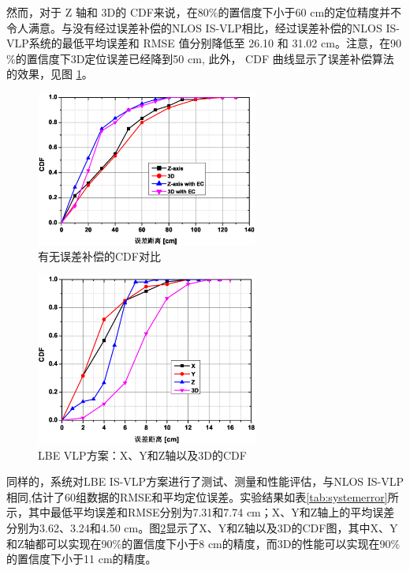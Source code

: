 然而，对于 Z 轴和 3D的 CDF来说，在80$\%$的置信度下小于60 cm的定位精度并不令人满意。与没有经过误差补偿的NLOS IS-VLP相比，经过误差补偿的NLOS IS-VLP系统的最低平均误差和 RMSE 值分别降低至 26.10 和 31.02 cm。注意，在90$\%$的置信度下3D定位误差已经降到50 cm, 此外， CDF 曲线显示了误差补偿算法的效果，见图 \ref{fig:errorcompensation}。
\begin{figure}[!t]
\centering\includegraphics[width=0.65\textwidth]{FIG/518.eps}
\caption{有无误差补偿的CDF对比}
\label{fig:errorcompensation}
\end{figure}

\begin{figure}[!t]
\centering\includegraphics[width=0.65\textwidth]{FIG/519.eps}
\caption{LBE VLP方案：X、Y和Z轴以及3D的CDF}
\label{fig:cdflabel}
\end{figure}


同样的，系统对LBE IS-VLP方案进行了测试、测量和性能评估，与NLOS IS-VLP相同,估计了60组数据的RMSE和平均定位误差。实验结果如表\ref{tab:systemerror}所示，其中最低平均误差和RMSE分别为7.31和7.74 cm；X、Y和Z轴上的平均误差分别为3.62、3.24和4.50 cm。图\ref{fig:cdflabel}显示了X、Y和Z轴以及3D的CDF图，其中X、Y和Z轴都可以实现在90$\%$的置信度下小于8 cm的精度，而3D的性能可以实现在90$\%$的置信度下小于11 cm的精度。



